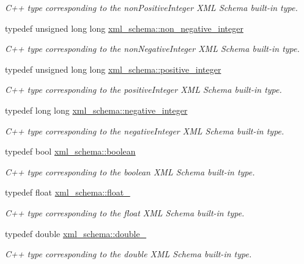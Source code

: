 \begin{DoxyCompactItemize}
\begin{DoxyCompactList}\small\item\em C++ type corresponding to the non\+Positive\+Integer X\+M\+L Schema built-\/in type. \end{DoxyCompactList}\item 
typedef unsigned long long \hyperlink{namespacexml__schema_af42ef5911d65f41a0a03598b056f05aa}{xml\+\_\+schema\+::non\+\_\+negative\+\_\+integer}
\begin{DoxyCompactList}\small\item\em C++ type corresponding to the non\+Negative\+Integer X\+M\+L Schema built-\/in type. \end{DoxyCompactList}\item 
typedef unsigned long long \hyperlink{namespacexml__schema_abe9d639a15a121d2868ae2f9c974ca24}{xml\+\_\+schema\+::positive\+\_\+integer}
\begin{DoxyCompactList}\small\item\em C++ type corresponding to the positive\+Integer X\+M\+L Schema built-\/in type. \end{DoxyCompactList}\item 
typedef long long \hyperlink{namespacexml__schema_acf9528a84381d07f2802785c947bf441}{xml\+\_\+schema\+::negative\+\_\+integer}
\begin{DoxyCompactList}\small\item\em C++ type corresponding to the negative\+Integer X\+M\+L Schema built-\/in type. \end{DoxyCompactList}\item 
typedef bool \hyperlink{namespacexml__schema_ae5ada4ec9c54b51765c3e4c0e9631bba}{xml\+\_\+schema\+::boolean}
\begin{DoxyCompactList}\small\item\em C++ type corresponding to the boolean X\+M\+L Schema built-\/in type. \end{DoxyCompactList}\item 
typedef float \hyperlink{namespacexml__schema_ad7e04ab17bba0b3fdde43fb79ef6ed87}{xml\+\_\+schema\+::float\+\_\+}
\begin{DoxyCompactList}\small\item\em C++ type corresponding to the float X\+M\+L Schema built-\/in type. \end{DoxyCompactList}\item 
typedef double \hyperlink{namespacexml__schema_aac2d3d3483d3a20e8d96d2e8e5b3a470}{xml\+\_\+schema\+::double\+\_\+}
\begin{DoxyCompactList}\small\item\em C++ type corresponding to the double X\+M\+L Schema built-\/in type. \end{DoxyCompactList}\item 

\end{DoxyCompactItemize}
